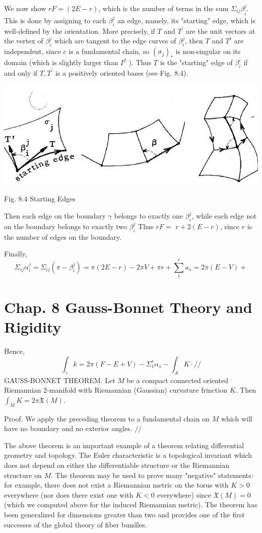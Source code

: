 \documentclass[10pt]{article}
\begin{document}
We now show $r F=(2 E-r)$, which is the number of terms in the sum $\Sigma_{i j} \beta_{i^{*}}^{j}$ This is done by assigning to each $\beta_{i}^{j}$ an edge, namely, its "starting" edge, which is well-defined by the orientation. More precisely, if $T$ and $T^{\prime}$ are the unit vectors at the vertex of $\beta_{i}^{j}$ which are tangent to the edge curves of $\beta_{i}^{j}$, then $T$ and $T^{t}$ are independent, since $c$ is a fundamental chain, so $\left(\sigma_{j}\right)_{*}$ is non-singular on its domain (which is slightly larger than $I^{2}$ ). Thus $T$ is the "starting" edge of $\beta_{i}^{i}$ if and only if $T, T^{\prime}$ is a positively oriented bases (see Fig. 8.4).

\includegraphics[max width=\textwidth]{2022_07_16_f4e476ee2159dc67e746g-59}

Fig. $8.4$ Starting Edges

Then each edge on the boundary $\gamma$ belongs to exactly one $\beta_{i}^{j}$, while each edge not on the boundary belongs to exactly two $\beta_{i}^{j}$ Thus $r F=$ $r+2(E-r)$, since $r$ is the number of edges on the boundary.

Finally,
$$
\Sigma_{i j} \alpha_{i}^{j}=\Sigma_{i j}\left(\pi-\beta_{i}^{j}\right)=\pi(2 E-r)-2 \pi V+\pi r+\sum_{1}^{r} a_{s}=2 \pi(E-V)+
$$

\section{Chap. 8 Gauss-Bonnet Theory and Rigidity}
Hence,
$$
\int_{\gamma} k=2 \pi(F-E+V)-\Sigma_{1}^{r} \alpha_{s}-\int_{A} K \cdot / /
$$
GAUSS-BONNET THEOREM. Let $M$ be a compact connected oriented Riemannian 2-manifold with Riemannian (Gaussian) curvature frinction $K$. Then $\int_{M} K=2 \pi \mathfrak{X}(M)$.

Proof. We apply the preceding theorem to a fundamental chain on $M$ which will have no boundary and no exterior angles. $/ /$

The above theorem is an important example of a theorem relating differential geometry and topology. The Euler characteristic is a topological invariant which does not depend on either the differentiable structure or the Riemannian structure on $M$. The theorem may be used to prove many "negative" statements: for example, there does not exist a Riemannian metric on the torus with $K>0$ everywhere (nor does there exist one with $K<0$ everywhere) since $\mathfrak{X}(M)=0$ (which we computed above for the induced Riemannian metric). The theorem has been generalized for dimensions greater than two and provides one of the first successes of the global theory of fiber bundles.
\end{document}
